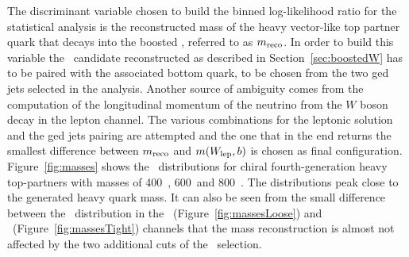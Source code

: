 The discriminant variable chosen to build the binned log-likelihood ratio
for the statistical analysis is the reconstructed mass of the
heavy vector-like top partner quark that decays into the boosted \whad, 
referred to as $m_{\rm reco}$. In order to build this variable the \whad\ 
candidate reconstructed as described in Section~\ref{sec:boostedW} has to
be paired with the associated bottom quark, to be chosen from the two
\btag ged jets selected in the analysis.
Another source of ambiguity comes from the computation of the longitudinal
momentum of the neutrino from the $W$ boson decay in the lepton channel.
The various combinations for the leptonic solution and the \btag ged jets
pairing are attempted and the one that in the end returns
the smallest difference between $m_{\rm reco}$ and $m(\wlep,b)$ is chosen
as final configuration. Figure~\ref{fig:masses} shows the \mreco\ distributions
for chiral fourth-generation heavy top-partners with masses of 400~\gev,
600~\gev and 800~\gev. The distributions peak close to the generated 
heavy quark mass. It can also be seen from the small difference
between the \mreco\ distribution in the \loose\ (Figure~\ref{fig:massesLoose})
and \tight\ (Figure~\ref{fig:massesTight}) channels that the mass reconstruction
is almost not affected by the two additional cuts of the \tight\ selection.

